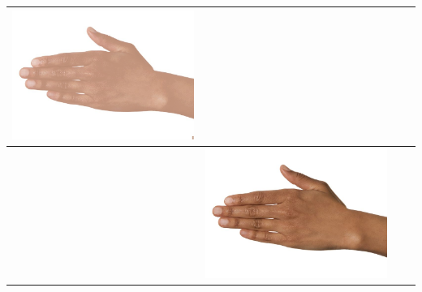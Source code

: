 \begin{longtable}{|N||c|c|c|}
\begin{minipage}{.29\textwidth}
    \includegraphics[width=\textwidth,height=\textheight,keepaspectratio]{../rc_test/outputs/20170517_proportional_corrected_test_alpha10/hand_brown_to_hand_light.jpg}
  \end{minipage} \\
\hline  \label{row:prop_correct_test_a10_hand_brown_to_hand_pale} &
  \begin{minipage}{.29\textwidth}
    \includegraphics[width=\textwidth,height=\textheight,keepaspectratio]{../inputs/hand_brown.jpg}
  \end{minipage} & 
  \begin{minipage}{.29\textwidth}

\end{minipage}
\end{longtable}
